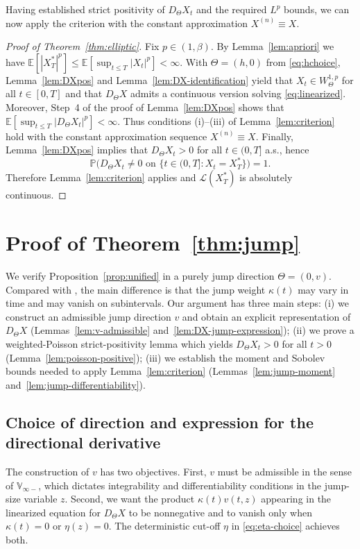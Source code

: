 \documentclass[11pt]{article}
\newcommand{\E}{\mathbb{E}}
\newcommand{\Pbb}{\mathbb{P}}
\newcommand{\Vb}{\mathbb{V}}
\newcommand{\1}{\mathbf{1}}
\newcommand{\law}{\mathcal{L}}
\newcommand{\Xstar}{X^{\ast}}
\theoremstyle{plain}
\theoremstyle{definition}
\theoremstyle{remark}
\begin{document}
Having established strict positivity of $D_\Theta X_t$ and the required $L^p$ bounds, we can now apply the criterion with the constant approximation $X^{(n)}\equiv X$.

\begin{proof}[Proof of Theorem~\ref{thm:elliptic}]
Fix $p\in(1,\beta)$.
By Lemma~\ref{lem:apriori} we have $\E[|\Xstar_T|^p]\le \E[\sup_{t\le T}|X_t|^p]<\infty$.
With $\Theta=(h,0)$ from \eqref{eq:hchoice}, Lemma~\ref{lem:DXpos} and Lemma~\ref{lem:DX-identification} yield that $X_t\in W^{1,p}_\Theta$
for all $t\in[0,T]$ and that $D_\Theta X$ admits a continuous version solving \eqref{eq:linearized}.
Moreover, Step~4 of the proof of Lemma~\ref{lem:DXpos} shows that $\E[\sup_{t\le T}|D_\Theta X_t|^p]<\infty$.
Thus conditions (i)--(iii) of Lemma~\ref{lem:criterion} hold with the constant approximation sequence $X^{(n)}\equiv X$.
Finally, Lemma~\ref{lem:DXpos} implies that $D_\Theta X_t>0$ for all $t\in(0,T]$ a.s., hence
\[
\Pbb\big(D_\Theta X_t\neq 0 \text{ on }\{t\in(0,T]: X_t=\Xstar_T\}\big)=1.
\]
Therefore Lemma~\ref{lem:criterion} applies and $\law(\Xstar_T)$ is absolutely continuous.
\end{proof}


\section{Proof of Theorem~\ref{thm:jump}}


We verify Proposition~\ref{prop:unified} in a purely jump direction $\Theta=(0,v)$.
Compared with \cite{NakagawaSuzuki2024}, the main difference is that the jump weight $\kappa(t)$ may vary in time and may vanish on subintervals.
Our argument has three main steps:
(i) we construct an admissible jump direction $v$ and obtain an explicit representation of $D_\Theta X$ (Lemmas~\ref{lem:v-admissible} and~\ref{lem:DX-jump-expression});
(ii) we prove a weighted-Poisson strict-positivity lemma which yields $D_\Theta X_t>0$ for all $t>0$ (Lemma~\ref{lem:poisson-positive});
(iii) we establish the moment and Sobolev bounds needed to apply Lemma~\ref{lem:criterion} (Lemmas~\ref{lem:jump-moment} and~\ref{lem:jump-differentiability}).

\subsection{Choice of direction and expression for the directional derivative}

The construction of $v$ has two objectives.
First, $v$ must be admissible in the sense of $\Vb_{\infty-}$, which dictates integrability and differentiability conditions in the jump-size variable $z$.
Second, we want the product $\kappa(t)v(t,z)$ appearing in the linearized equation for $D_\Theta X$ to be nonnegative and to vanish only when $\kappa(t)=0$ or $\eta(z)=0$.
The deterministic cut-off $\eta$ in \eqref{eq:eta-choice} achieves both.
\end{document}
